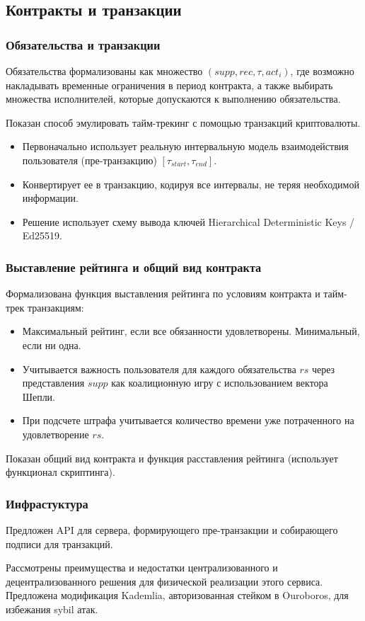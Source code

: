 \documentclass[11pt,handout,pdf,hyperref={unicode}]{beamer}
\begin{document}
\subsection{Контракты и транзакции}

\begin{frame}
  \frametitle{Обязательства и транзакции} Обязательства формализованы
  как множество $(supp, rec, \tau, act_i)$, где возможно накладывать
  временные ограничения в период контракта, а также выбирать множества
  исполнителей, которые допускаются к выполнению обязательства.

  Показан способ эмулировать тайм-трекинг с помощью транзакций криптовалюты.
  \begin{itemize}
  \item Первоначально использует реальную интервальную модель
    взаимодействия пользователя (пре-транзакцию) $[\tau_{start}, \tau_{end}]$.
  \item Конвертирует ее в транзакцию, кодируя все интервалы, не теряя
    необходимой информации.
  \item Решение использует схему вывода ключей Hierarchical
    Deterministic Keys / Ed25519.
  \end{itemize}
\end{frame}

\begin{frame}
  \frametitle{Выставление рейтинга и общий вид контракта}

  Формализована функция выставления рейтинга по условиям контракта и
  тайм-трек транзакциям:
  \begin{itemize}
  \item Максимальный рейтинг, если все обязанности
    удовлетворены. Минимальный, если ни одна.
  \item Учитывается важность пользователя для каждого обязательства
    $rs$ через представления $supp$ как коалиционную игру с
    использованием вектора Шепли.
  \item При подсчете штрафа учитывается количество времени уже
    потраченного на удовлетворение $rs$.
  \end{itemize}

  Показан общий вид контракта и функция расставления рейтинга
  (использует функционал скриптинга).
\end{frame}

\begin{frame}
  \frametitle{Инфрастуктура}

  Предложен API для сервера, формирующего пре-транзакции и собирающего
  подписи для транзакций.

  Рассмотрены преимущества и недостатки централизованного и
  децентрализованного решения для физической реализации этого
  сервиса. Предложена модификация Kademlia, авторизованная стейком в
  Ouroboros, для избежания sybil атак.
\end{frame}
\end{document}
